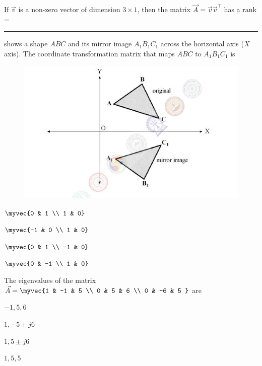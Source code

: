 \item If $\vec{v}$ is a non-zero vector of dimension $3\times 1$, then the matrix
$\vec{A} = \vec{v}\vec{v}^{\top}$ has a rank = \rule{1cm}{0.01pt} 
\hfill{}
\item {} shows a shape $ABC$ and its mirror image $A_1B_1C_1$ across the horizontal axis ($X$ axis). 
The coordinate transformation matrix that maps $ABC$ to $A_1B_1C_1$ is 

\hfill{}
\begin{figure}[H]
    \centering
    \includegraphics[width=0.5\columnwidth]{GATE/2017/IN/figs/Q-2.png}
    \caption{}
    \label{fig:placeholder_1}
\end{figure}
\begin{enumerate}
\begin{multicols}{4}
    \item $\myvec{0 & 1 \\ 1 & 0}$
    \item $\myvec{-1 & 0 \\ 1 & 0}$
    \item $\myvec{0 & 1 \\ -1 & 0}$
    \item $\myvec{0 & -1 \\ 1 & 0}$
\end{multicols}
\end{enumerate}
\item The eigenvalues of the matrix 
$\vec{A} = \myvec{1 & -1 & 5 \\ 0 & 5 & 6 \\ 0 & -6 & 5 }$
are  \hfill{}
\begin{enumerate}
\begin{multicols}{4}
    \item $-1, 5, 6$
    \item $1, -5 \pm j6$
    \item $1, 5 \pm j6$
    \item $1, 5, 5$    
\end{multicols}
\end{enumerate}

